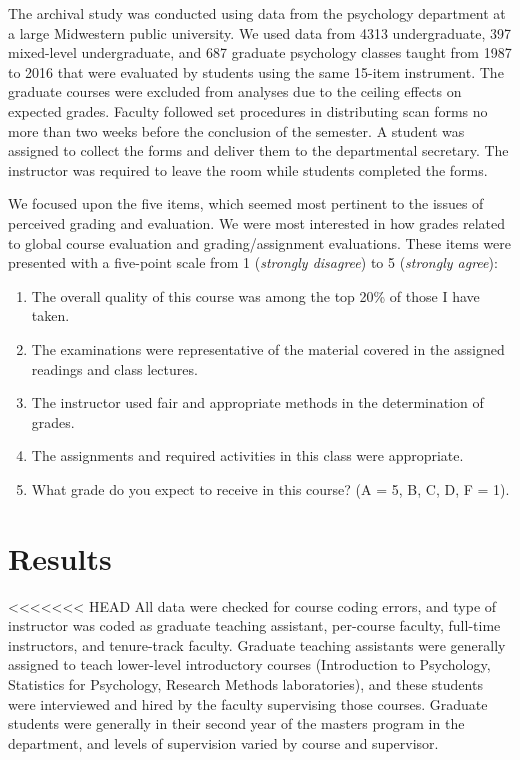 \documentclass[man]{apa6}
\providecommand{\tightlist}{%
  \setlength{\itemsep}{0pt}\setlength{\parskip}{0pt}}
\theoremstyle{definition}
\theoremstyle{definition}
\theoremstyle{definition}
\theoremstyle{remark}
\begin{document}
The archival study was conducted using data from the psychology department at a large Midwestern public university. We used data from 4313 undergraduate, 397 mixed-level undergraduate, and 687 graduate psychology classes taught from 1987 to 2016 that were evaluated by students using the same 15-item instrument. The graduate courses were excluded from analyses due to the ceiling effects on expected grades. Faculty followed set procedures in distributing scan forms no more than two weeks before the conclusion of the semester. A student was assigned to collect the forms and deliver them to the departmental secretary. The instructor was required to leave the room while students completed the forms.

We focused upon the five items, which seemed most pertinent to the issues of perceived grading and evaluation. We were most interested in how grades related to global course evaluation and grading/assignment evaluations. These items were presented with a five-point scale from 1 (\emph{strongly disagree}) to 5 (\emph{strongly agree}):

\begin{enumerate}
\def\labelenumi{\arabic{enumi})}
\tightlist
\item
  The overall quality of this course was among the top 20\% of those I have taken.
\item
  The examinations were representative of the material covered in the assigned readings and class lectures.
\item
  The instructor used fair and appropriate methods in the determination of grades.
\item
  The assignments and required activities in this class were appropriate.
\item
  What grade do you expect to receive in this course? (A = 5, B, C, D, F = 1).
\end{enumerate}

\section{Results}\label{results}

<<<<<<< HEAD
All data were checked for course coding errors, and type of instructor
was coded as graduate teaching assistant, per-course faculty, full-time
instructors, and tenure-track faculty. Graduate teaching assistants were
generally assigned to teach lower-level introductory courses
(Introduction to Psychology, Statistics for Psychology, Research Methods
laboratories), and these students were interviewed and hired by the
faculty supervising those courses. Graduate students were generally in
their second year of the masters program in the department, and levels
of supervision varied by course and supervisor.
\end{document}
